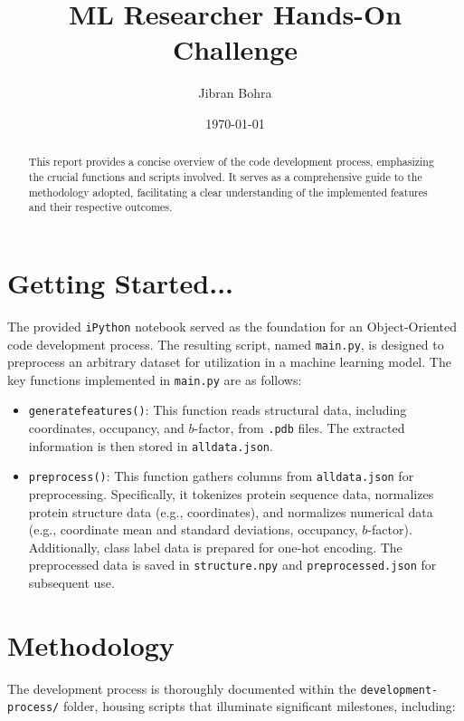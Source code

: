 \documentclass[a4paper,12pt]{article}
\title{ML Researcher Hands-On Challenge}
\author{Jibran Bohra}
\date{\today}
\begin{document}
\maketitle

\begin{abstract}
This report provides a concise overview of the code development process, emphasizing the crucial functions and scripts involved. It serves as a comprehensive guide to the methodology adopted, facilitating a clear understanding of the implemented features and their respective outcomes.\end{abstract}

\tableofcontents
\newpage

\section{Getting Started...}
\label{sec:introduction}
The provided \texttt{iPython} notebook served as the foundation for an Object-Oriented code development process. The resulting script, named \texttt{main.py}, is designed to preprocess an arbitrary dataset for utilization in a machine learning model. The key functions implemented in \texttt{main.py} are as follows:

\begin{itemize}
\item \texttt{generate\textunderscore features()}: This function reads structural data, including coordinates, occupancy, and $b$-factor, from \texttt{.pdb} files. The extracted information is then stored in \texttt{all\textunderscore data.json}.

\item \texttt{preprocess()}: This function gathers columns from \texttt{all\textunderscore data.json} for preprocessing. Specifically, it tokenizes protein sequence data, normalizes protein structure data (e.g., coordinates), and normalizes numerical data (e.g., coordinate mean and standard deviations, occupancy, $b$-factor). Additionally, class label data is prepared for one-hot encoding. The preprocessed data is saved in \texttt{structure.npy} and \texttt{preprocessed.json} for subsequent use.
\end{itemize}

\section{Methodology}
\label{sec:methodology}

The development process is thoroughly documented within the \texttt{development-process/} folder, housing scripts that illuminate significant milestones, including:
\end{document}
